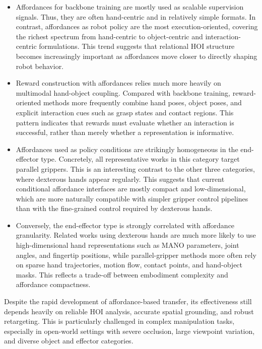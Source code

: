 \documentclass[Afour,sageh,times]{sagej}
\begin{document}
\begin{itemize}[leftmargin=1em]
\setlength{\parskip}{0pt}
\item Affordances for backbone training are mostly used as scalable supervision signals. Thus, they are often hand-centric and in relatively simple formats. In contrast, affordances as robot policy are the most execution-oriented, covering the richest spectrum from hand-centric to object-centric and interaction-centric formulations. This trend suggests that relational HOI structure becomes increasingly important as affordances move closer to directly shaping robot behavior.

\item Reward construction with affordances relies much more heavily on multimodal hand-object coupling. Compared with backbone training, reward-oriented methods more frequently combine hand poses, object poses, and explicit interaction cues such as grasp states and contact regions. This pattern indicates that rewards must evaluate whether an interaction is successful, rather than merely whether a representation is informative.

\item Affordances used as policy conditions are strikingly homogeneous in the end-effector type. Concretely, all representative works in this category target parallel grippers. This is an interesting contrast to the other three categories, where dexterous hands appear regularly. This suggests that current conditional affordance interfaces are mostly compact and low-dimensional, which are more naturally compatible with simpler gripper control pipelines than with the fine-grained control required by dexterous hands.


\item Conversely, the end-effector type is strongly correlated with affordance granularity. Related works using dexterous hands are much more likely to use high-dimensional hand representations such as MANO parameters, joint angles, and fingertip positions, while parallel-gripper methods more often rely on sparse hand trajectories, motion flow, contact points, and hand-object masks. This reflects a trade-off between embodiment complexity and affordance compactness.
\end{itemize}

Despite the rapid development of affordance-based transfer, its effectiveness still depends heavily on reliable HOI analysis, accurate spatial grounding, and robust retargeting. This is particularly challenged in complex manipulation tasks, especially in open-world settings with severe occlusion, large viewpoint variation, and diverse object and effector categories. 
\end{document}
